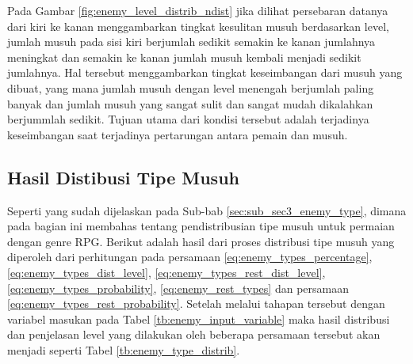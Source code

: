 Pada Gambar \ref{fig:enemy_level_distrib_ndist} jika dilihat persebaran datanya dari kiri ke kanan menggambarkan tingkat kesulitan musuh berdasarkan level, jumlah musuh pada sisi kiri berjumlah sedikit semakin ke kanan jumlahnya meningkat dan semakin ke kanan jumlah musuh kembali menjadi sedikit jumlahnya. Hal tersebut menggambarkan tingkat keseimbangan dari musuh yang dibuat, yang mana jumlah musuh dengan level menengah berjumlah paling banyak dan jumlah musuh yang sangat sulit dan sangat mudah dikalahkan berjummlah sedikit. Tujuan utama dari kondisi tersebut adalah terjadinya keseimbangan saat terjadinya pertarungan antara pemain dan musuh.
\vspace{1ex}


\subsection{Hasil Distibusi Tipe Musuh}
\label{sec:sub_sec4_eval_dist_enemy_type}
\vspace{1ex}

Seperti yang sudah dijelaskan pada Sub-bab \ref{sec:sub_sec3_enemy_type}, dimana pada bagian ini membahas tentang pendistribusian tipe musuh untuk permaian dengan genre RPG. Berikut adalah hasil dari proses distribusi tipe musuh yang diperoleh dari perhitungan pada persamaan \ref{eq:enemy_types_percentage}, \ref{eq:enemy_types_dist_level}, \ref{eq:enemy_types_rest_dist_level}, \ref{eq:enemy_types_probability}, \ref{eq:enemy_rest_types} dan persamaan \ref{eq:enemy_types_rest_probability}. Setelah melalui tahapan tersebut dengan variabel masukan pada Tabel \ref{tb:enemy_input_variable} maka hasil distribusi dan penjelasan level yang dilakukan oleh beberapa persamaan tersebut akan menjadi seperti Tabel \ref{tb:enemy_type_distrib}.

